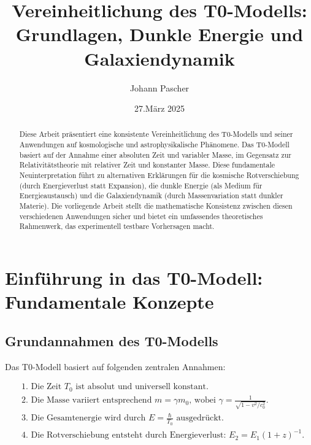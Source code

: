 \documentclass[a4paper,12pt]{article}
\begin{document}
	
	\title{Vereinheitlichung des T0-Modells: \\Grundlagen, Dunkle Energie und Galaxiendynamik}
	\author{Johann Pascher}
	\date{27.März 2025}
	\maketitle
	
	\begin{abstract}
		Diese Arbeit präsentiert eine konsistente Vereinheitlichung des T0-Modells und seiner Anwendungen auf kosmologische und astrophysikalische Phänomene. Das T0-Modell basiert auf der Annahme einer absoluten Zeit und variabler Masse, im Gegensatz zur Relativitätstheorie mit relativer Zeit und konstanter Masse. Diese fundamentale Neuinterpretation führt zu alternativen Erklärungen für die kosmische Rotverschiebung (durch Energieverlust statt Expansion), die dunkle Energie (als Medium für Energieaustausch) und die Galaxiendynamik (durch Massenvariation statt dunkler Materie). Die vorliegende Arbeit stellt die mathematische Konsistenz zwischen diesen verschiedenen Anwendungen sicher und bietet ein umfassendes theoretisches Rahmenwerk, das experimentell testbare Vorhersagen macht.
	\end{abstract}
	
	\tableofcontents
	\newpage
	
	\section{Einführung in das T0-Modell: Fundamentale Konzepte}
	
	\subsection{Grundannahmen des T0-Modells}
	
	Das T0-Modell basiert auf folgenden zentralen Annahmen:
	
	\begin{tcolorbox}[colback=blue!5!white,colframe=blue!75!black,title=Grundannahmen des T0-Modells]
		\begin{align}
			&\text{1. Die Zeit $T_0$ ist absolut und universell konstant.} \\
			&\text{2. Die Masse variiert entsprechend $m = \gamma m_0$, wobei $\gamma = \frac{1}{\sqrt{1-v^2/c_0^2}}$.} \\
			&\text{3. Die Gesamtenergie wird durch $E = \frac{\hbar}{T_0}$ ausgedrückt.} \\
			&\text{4. Die Rotverschiebung entsteht durch Energieverlust: $E_2 = E_1(1+z)^{-1}$.}
		\end{align}
	\end{tcolorbox}
	
\end{document}

